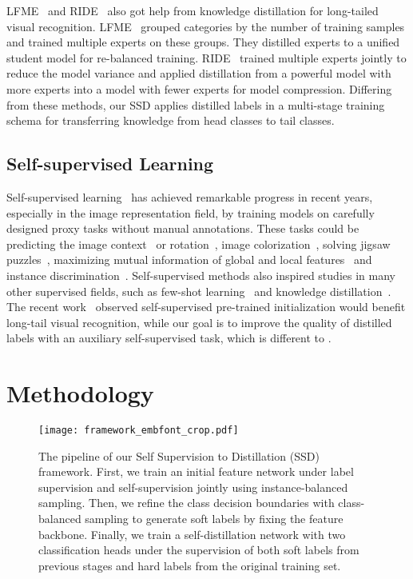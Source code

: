 \documentclass[10pt,twocolumn,letterpaper]{article}
\begin{document}
LFME~\cite{LFME} and RIDE~\cite{ride} also got help from knowledge distillation for long-tailed visual recognition. LFME~\cite{LFME} grouped categories by the number of training samples and trained multiple experts on these groups. They distilled experts to a unified student model for re-balanced training. RIDE~\cite{ride} trained multiple experts jointly to reduce the model variance and applied distillation from a powerful model with more experts into a model with fewer experts for model compression. Differing from these methods, our SSD applies distilled labels in a multi-stage training schema for transferring knowledge from head classes to tail classes.

\subsection{Self-supervised Learning}
Self-supervised learning~\cite{rotation, unsupervisedcontext, color, insdis, moco, simclr, cmc} has achieved remarkable progress in recent years, especially in the image representation field, by training models on carefully designed proxy tasks without manual annotations. These tasks could be predicting the image context~\cite{unsupervisedcontext, inpainting} or rotation~\cite{rotation}, image colorization~\cite{color}, solving jigsaw puzzles~\cite{jigsaw}, maximizing mutual information of global and local features~\cite{infomax} and instance discrimination~\cite{insdis, moco, simclr}. Self-supervised methods also inspired studies in many other supervised fields, such as few-shot learning~\cite{boostfewshot} and knowledge distillation~\cite{selfsupervisedkd}. The recent work~\cite{labelvalue} observed self-supervised pre-trained initialization would benefit long-tail visual recognition, while our goal is to improve the quality of distilled labels with an auxiliary self-supervised task, which is different to \cite{labelvalue}.

\section{Methodology}

\begin{figure*}[t]
\centering
\texttt{[image: framework\_embfont\_crop.pdf]}
  \caption{The pipeline of our Self Supervision to Distillation (SSD) framework. First, we train an initial feature network under label supervision and self-supervision jointly using instance-balanced sampling. Then, we refine the class decision boundaries with class-balanced sampling to generate soft labels by fixing the feature backbone. Finally, we train a self-distillation network with two classification heads under the supervision of both soft labels from previous stages and hard labels from the original training set.}
  \label{fig:framework}
\end{figure*}
\end{document}

